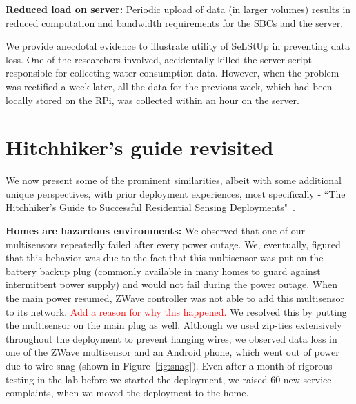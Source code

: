 \documentclass[10pt]{sensys-proc}
\newcommand{\redcolor}[1]{\textcolor{red}{#1}}
\newcommand{\figref}[1]{Figure~\ref{#1}}
\newcommand{\selstups}{SeLStUp }
\begin{document}
\noindent \textbf{Reduced load on server:} Periodic upload of data (in larger volumes) results in reduced computation and bandwidth requirements for the SBCs and the server. 

We provide anecdotal evidence to illustrate utility of \selstups in preventing data loss. One of the researchers involved, accidentally killed the server script responsible for collecting water consumption data. However, when the problem was rectified a week later, all the data for the previous week, which had been locally stored on the RPi, was collected within an hour on the server. 


\vspace{-1mm}
\section{Hitchhiker's guide revisited}
\label{sec:common}
We now present some of the prominent similarities, albeit with some additional unique perspectives, with prior deployment experiences, most specifically - ``The Hitchhiker's Guide to Successful Residential Sensing Deployments"~\cite{hitchhiker_residential}. 

\noindent \textbf{Homes are hazardous environments:} We observed that one of our multisensors repeatedly failed after every power outage. %
We, eventually, figured that this behavior was due to the fact that this multisensor was put on the battery backup plug (commonly available in many homes to guard against intermittent power supply) and would not fail during the power outage. When the main power resumed, ZWave controller was not able to add this multisensor to its network. \redcolor{Add a reason for why this happened.} We resolved this by putting the multisensor on the main plug as well. %
Although we used zip-ties extensively throughout the deployment to prevent hanging wires, we observed data loss in one of the ZWave multisensor and an Android phone, which went out of power due to wire snag (shown in \figref{fig:snag}). Even after a month of rigorous testing in the lab before we started the deployment, we raised 60 new service complaints, when we moved the deployment to the home. %
\end{document}
